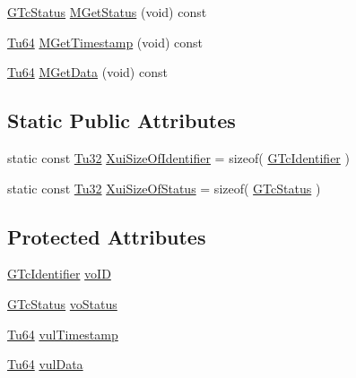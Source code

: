 \begin{DoxyCompactItemize}
\item 
\mbox{\hyperlink{class_g_n_common_1_1_g_n_notification_1_1_g_tc_status}{G\+Tc\+Status}} \mbox{\hyperlink{class_g_n_common_1_1_g_n_notification_1_1_g_tc_alert_a9712a84712c079c649a368302cfaf671}{M\+Get\+Status}} (void) const
\item 
\mbox{\hyperlink{namespace_g_n_common_a9404ee6090c788ae70aebd1436ceb97d}{Tu64}} \mbox{\hyperlink{class_g_n_common_1_1_g_n_notification_1_1_g_tc_alert_a490bb2fc3356e611086e412c87c07fb8}{M\+Get\+Timestamp}} (void) const
\item 
\mbox{\hyperlink{namespace_g_n_common_a9404ee6090c788ae70aebd1436ceb97d}{Tu64}} \mbox{\hyperlink{class_g_n_common_1_1_g_n_notification_1_1_g_tc_alert_adcde6f9412623e28a38d06aab8379b41}{M\+Get\+Data}} (void) const
\end{DoxyCompactItemize}
\subsection*{Static Public Attributes}
\begin{DoxyCompactItemize}
\item 
static const \mbox{\hyperlink{namespace_g_n_common_a941b527ef318f318aed7903dc832b7e4}{Tu32}} \mbox{\hyperlink{class_g_n_common_1_1_g_n_notification_1_1_g_tc_alert_a9ea52a484cdd0e6259e3245d27dac15d}{Xui\+Size\+Of\+Identifier}} = sizeof( \mbox{\hyperlink{class_g_n_common_1_1_g_n_notification_1_1_g_tc_identifier}{G\+Tc\+Identifier}} )
\item 
static const \mbox{\hyperlink{namespace_g_n_common_a941b527ef318f318aed7903dc832b7e4}{Tu32}} \mbox{\hyperlink{class_g_n_common_1_1_g_n_notification_1_1_g_tc_alert_ae2a0f255e99e8753443532c9da6a2f04}{Xui\+Size\+Of\+Status}} = sizeof( \mbox{\hyperlink{class_g_n_common_1_1_g_n_notification_1_1_g_tc_status}{G\+Tc\+Status}} )
\end{DoxyCompactItemize}
\subsection*{Protected Attributes}
\begin{DoxyCompactItemize}
\item 
\mbox{\hyperlink{class_g_n_common_1_1_g_n_notification_1_1_g_tc_identifier}{G\+Tc\+Identifier}} \mbox{\hyperlink{class_g_n_common_1_1_g_n_notification_1_1_g_tc_alert_a102266ad89b5f53047fdbf8d180079d9}{vo\+ID}}
\item 
\mbox{\hyperlink{class_g_n_common_1_1_g_n_notification_1_1_g_tc_status}{G\+Tc\+Status}} \mbox{\hyperlink{class_g_n_common_1_1_g_n_notification_1_1_g_tc_alert_afb7acdf666bf082d8d1e455e7f23b41a}{vo\+Status}}
\item 
\mbox{\hyperlink{namespace_g_n_common_a9404ee6090c788ae70aebd1436ceb97d}{Tu64}} \mbox{\hyperlink{class_g_n_common_1_1_g_n_notification_1_1_g_tc_alert_a2ab5cc0fac17a8220210a76f250a46e7}{vul\+Timestamp}}
\item 
\mbox{\hyperlink{namespace_g_n_common_a9404ee6090c788ae70aebd1436ceb97d}{Tu64}} \mbox{\hyperlink{class_g_n_common_1_1_g_n_notification_1_1_g_tc_alert_ab9bd5e60a00deca0f21b720c90c2d922}{vul\+Data}}
\end{DoxyCompactItemize}
